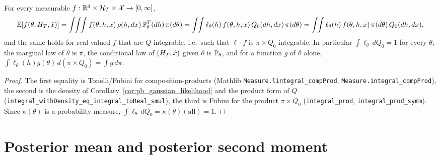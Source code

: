 \begin{lemma}\label{lem:pb_joint_fubini}
\leanok
{}
For every measurable $f : \mathbb{R}^d\times\mathcal{H}_T\times\mathcal{X}\to[0,\infty]$,
\[
  \E[f(\theta,\hist_T,\rec)]
  = \int\!\!\int\!\!\int f(\theta,h,x)\,\rho(h,dx)\,\Prob_\theta^T(dh)\,\pi(d\theta)
  = \int\!\!\int\ell_\theta(h)\,f(\theta,h,x)\,Q_0(dh,dx)\,\pi(d\theta)
  = \int\!\!\int\ell_\theta(h)\,f(\theta,h,x)\,\pi(d\theta)\,Q_0(dh,dx),
\]
and the same holds for real-valued $f$ that are $Q$-integrable, i.e.\ such that
$\ell\cdot f$ is $\pi\times Q_0$-integrable. In particular $\int\ell_\theta\,dQ_0 = 1$ for every
$\theta$, the marginal law of $\theta$ is $\pi$, the conditional law
of $(H_T,\hat{x})$ given $\theta$ is $\mathbb{P}_\theta$, and for a function $g$ of $\theta$ alone,
$\int\ell_\theta(h)g(\theta)\,d(\pi\times Q_0) = \int g\,d\pi$.
\end{lemma}

\begin{proof}
\leanok
{}
The first equality is Tonelli/Fubini for composition-products (Mathlib
\texttt{Measure.lintegral\_compProd}, \texttt{Measure.integral\_compProd}), the second is the
density of Corollary~\ref{cor:pb_gaussian_likelihood} and the product form of $Q$
(\texttt{integral\_withDensity\_eq\_integral\_toReal\_smul}), the third is Fubini for the product
$\pi\times Q_0$ (\texttt{integral\_prod}, \texttt{integral\_prod\_symm}). Since
$\kappa(\theta)$ is a probability measure, $\int\ell_\theta\,dQ_0 = \kappa(\theta)(\text{all}) = 1$.
\end{proof}

\section{Posterior mean and posterior second moment}
\label{sec:pre_bayes_posterior}


